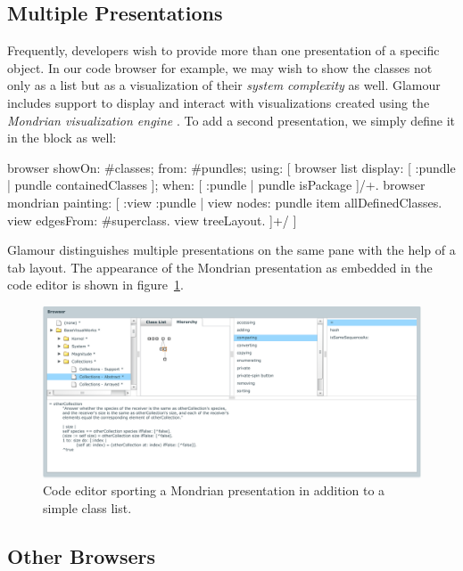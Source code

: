 \documentclass[a4paper,10pt,twoside]{book}
\begin{document}
\subsection{Multiple Presentations}

Frequently, developers wish to provide more than one presentation of a specific object. In our code browser for example, we may wish to show the classes not only as a list but as a visualization of their \emph{system complexity} as well. Glamour includes support to display and interact with visualizations created using the \emph{Mondrian visualization engine} \cite{Meye06b}. To add a second presentation, we simply define it in the  block as well:

\begin{code}{}
browser showOn: #classes; from: #pundles; using: [
	browser list 
		display: [ :pundle | pundle containedClasses ];
		when: [ :pundle | pundle isPackage ]/+.
	browser mondrian painting: [ :view :pundle |
		view nodes: pundle item allDefinedClasses.
		view edgesFrom: #superclass.
		view treeLayout.
	]+/
]
\end{code}

Glamour distinguishes multiple presentations on the same pane with the help of a tab layout. The appearance of the Mondrian presentation as embedded in the code editor is shown in figure~\ref{fig:mondrian-presentation}.

\begin{figure}[htbp]
\centerline{\includegraphics[width=\linewidth]{mondrian-presentation.pdf}}
\caption{Code editor sporting a Mondrian presentation in addition to a simple class list.}
\label{fig:mondrian-presentation}
\end{figure}


\subsection{Other Browsers}
\end{document}
